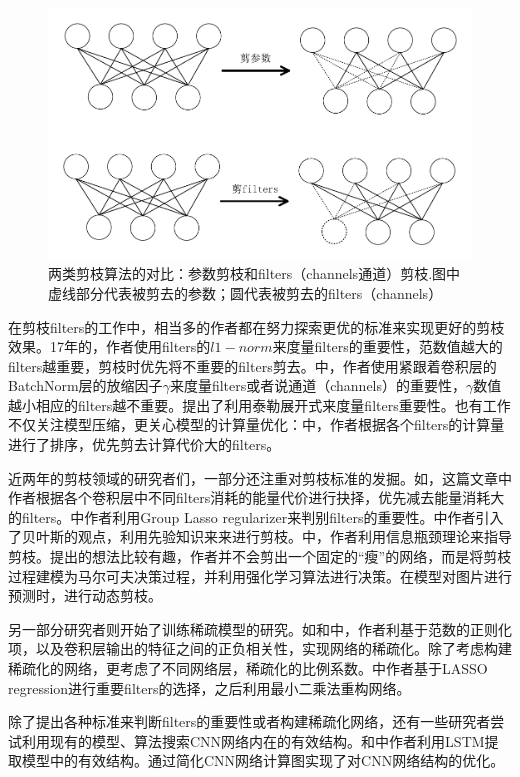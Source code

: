 \documentclass[ pdftex, oneside, master]{NJUthesis}
\begin{document}
\begin{figure}[h]
	\centering
	\includegraphics[width=0.7\linewidth]{pruning_simple_contrast.pdf}  %
	\caption{两类剪枝算法的对比：参数剪枝和filters（channels通道）剪枝.图中虚线部分代表被剪去的参数；圆代表被剪去的filters（channels）}  %
	\label{pruning_contrast}   %
\end{figure}

在剪枝filters的工作中，相当多的作者都在努力探索更优的标准来实现更好的剪枝效果。17年的\cite{17}，作者使用filters的$l1-norm$来度量filters的重要性，范数值越大的filters越重要，剪枝时优先将不重要的filters剪去。\cite{18}中，作者使用紧跟着卷积层的BatchNorm层的放缩因子$\gamma$来度量filters或者说通道（channels）的重要性，$\gamma$数值越小相应的filters越不重要。\cite{21}提出了利用泰勒展开式来度量filters重要性。也有工作不仅关注模型压缩，更关心模型的计算量优化：\cite{energy}中，作者根据各个filters的计算量进行了排序，优先剪去计算代价大的filters。

近两年的剪枝领域的研究者们，一部分还注重对剪枝标准的发掘。如\cite{cvprp71}，这篇文章中作者根据各个卷积层中不同filters消耗的能量代价进行抉择，优先减去能量消耗大的filters。\cite{icasspq73}中作者利用Group Lasso regularizer来判别filters的重要性。\cite{nipsq73}中作者引入了贝叶斯的观点，利用先验知识来来进行剪枝。\cite{icmlq81}中，作者利用信息瓶颈理论来指导剪枝。\cite{nipsp73}提出的想法比较有趣，作者并不会剪出一个固定的“瘦”的网络，而是将剪枝过程建模为马尔可夫决策过程，并利用强化学习算法进行决策。在模型对图片进行预测时，进行动态剪枝。

另一部分研究者则开始了训练稀疏模型的研究。如\cite{icmlp71}和\cite{iclrp81}中，作者利基于范数的正则化项，以及卷积层输出的特征之间的正负相关性，实现网络的稀疏化。\cite{cvprp81}除了考虑构建稀疏化的网络，更考虑了不同网络层，稀疏化的比例系数。\cite{iccvp71}中作者基于LASSO regression进行重要filters的选择，之后利用最小二乘法重构网络。

除了提出各种标准来判断filters的重要性或者构建稀疏化网络，还有一些研究者尝试利用现有的模型、算法搜索CNN网络内在的有效结构。\cite{28}和\cite{iclrp82}中作者利用LSTM提取模型中的有效结构。\cite{29}通过简化CNN网络计算图实现了对CNN网络结构的优化。
\end{document}
